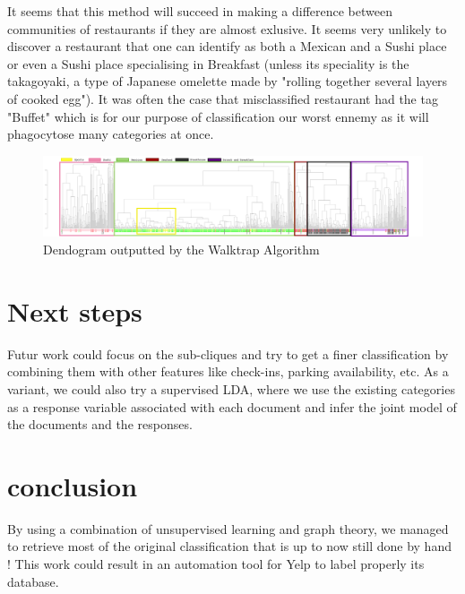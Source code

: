 \documentclass[twoside]{article}
\begin{document}
\begin{multicols}{2}
\noindent It seems that this method will succeed in making a difference between communities of restaurants if they are almost exlusive. It seems very unlikely to discover a restaurant that one can identify as both a Mexican and a Sushi place or even a Sushi place specialising in Breakfast (unless its speciality is the takagoyaki, a type of Japanese omelette made by "rolling together several layers of cooked egg"). It was often the case that misclassified restaurant had the tag "Buffet" which is for our purpose of classification our worst ennemy as it will phagocytose many categories at once.

\begin{figure}
\centering
\includegraphics[angle=90,width=0.25\linewidth]{den_ovi2-1.png}
\caption{Dendogram outputted by the Walktrap Algorithm}
\end{figure}


\section{Next steps}
Futur work could focus on the sub-cliques and try to get a finer classification by combining them with other features like check-ins, parking availability, etc. As a variant, we could also try a supervised LDA, where we use the existing categories as a response variable associated with each document and infer the joint model of the documents and the responses.

\section{conclusion}
By using a combination of unsupervised learning and graph theory, we managed to retrieve most of the original classification that is up to now still done by hand ! This work could result in an automation tool for Yelp to label properly its database. 


\nocite{*} %


\end{multicols}
\end{document}

